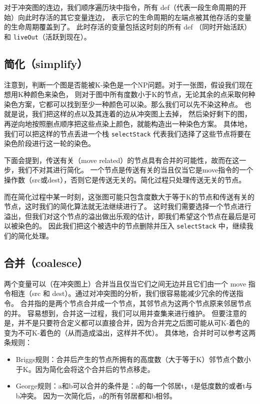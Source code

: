对于冲突图的连边，我们顺序遍历块中指令，所有 def（代表一段生命周期的开始）向此时存活的其它变量连边，
表示它的生命周期的左端点被其他存活的变量的生命周期覆盖到了。
此时存活的变量包括这时刻的所有 def （同时开始活跃）和 \texttt{liveOut}（活跃到现在）。

\subsection{简化（simplify）}
注意到，判断一个图是否能被K-染色是一个NP问题。对于一张图，假设我们现在想用K种颜色来染色，
则对于图中所有度数小于K的节点，无论其余的点采取何种染色方案，它都可以找到至少一种颜色可以染。那么我们可以先不染这种点。
也就是说，我们把这样的点以及其连着的边从冲突图上去掉，
然后染好剩下的图，再逆向地按照删点顺序把这些点染上颜色，就能构造出一种染色方案。
具体地，我们可以把这样的节点丢进一个栈 \texttt{selectStack} 代表我们选择了这些节点将要在染色阶段进行这一轮的染色。

下面会提到，传送有关（move related）的节点具有合并的可能性，故而在这一步，我们不对其进行简化。
一个节点是传送有关的当且仅当它是move指令的一个操作数（src或dest），否则它是传送无关的。简化过程只处理传送无关的节点。

而在简化过程中某一时刻，这张图可能只包含度数大于等于K的节点和传送有关的节点，这时我们的简化算法就无法继续进行了。
这时我们需要选择一个节点进行溢出，但我们对这个节点的溢出做出乐观的估计，即我们希望这个节点在最后是可以被染色的。
因此我们把这个被选中的节点删除并压入 \texttt{selectStack} 中，继续我们的简化处理。



\subsection{合并（coalesce）}
两个变量可以（在冲突图上）合并当且仅当它们之间无边并且它们由一个 move 指令相连（src 和 dest）。通过对冲突图的分析，我们很容易能减少冗余的传送指令。
合并指的是两个节点合并成一个节点，其邻节点为这两个节点原来邻居节点的并。
容易想到，合并这一过程，我们可以用并查集来进行维护。
但要注意的是，并不是只要符合定义都可以直接合并，因为合并完之后图可能从可K-着色的变为不可K-着色的（从而造成溢出，这样并不优）。
具体地，合并时可以参考这两条规则：
\begin{itemize}
    \item Briggs规则：合并后产生的节点所拥有的高度数（大于等于K）邻节点个数小于K。因为简化会将这个合并后的节点移走。
    \item George规则：a和b可以合并的条件是：a的每一个邻居t，t是低度数的或者t与b冲突。
    因为一次简化后，a的所有邻居都和b相邻。
\end{itemize}

